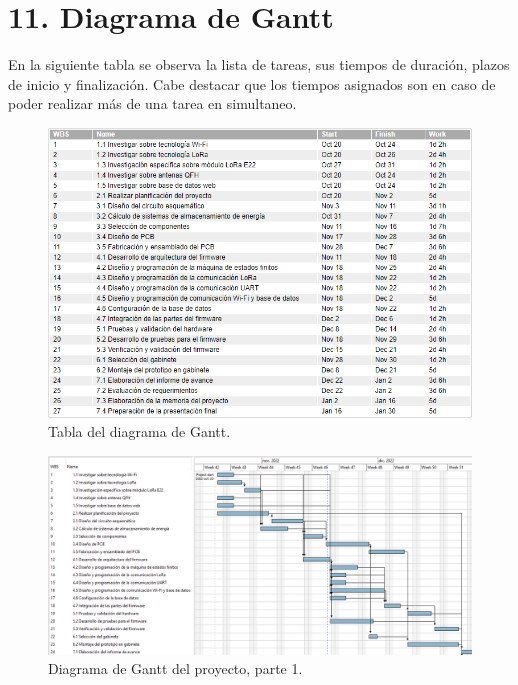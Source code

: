 \documentclass[
11pt, %
codirector, %
]{charter}
\begin{document}
\section{11. Diagrama de Gantt}
\label{sec:gantt}
En la siguiente tabla se observa la lista de tareas, sus tiempos de duración, plazos de inicio y finalización. Cabe destacar que los tiempos asignados son en caso de poder realizar más de una tarea en simultaneo.

\begin{figure}[htpb]
\centering 
\includegraphics[width=1\textwidth]{./Figuras/Tabla Gantt.png}
\caption{Tabla del diagrama de Gantt.}
\label{fig:tablaGantt}
\end{figure}

\begin{landscape}
\begin{figure}[htpb]
\centering 
\includegraphics[height=.7\textheight]{./Figuras/Diagrama Gantt 1.png}
\caption{Diagrama de Gantt del proyecto, parte 1.}
\label{fig:diagGantt1}
\end{figure}
\end{landscape}
\end{document}
